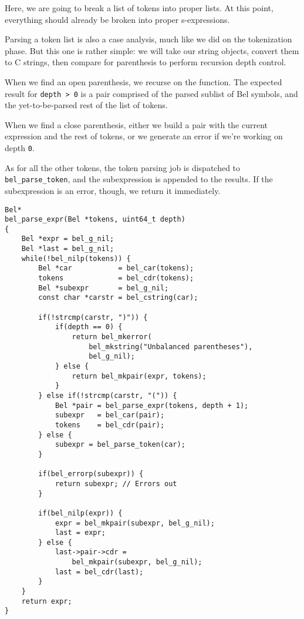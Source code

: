 \documentclass[openright,a4paper,twoside,12pt]{memoir}
\begin{document}
Here, we  are going to  break a list of  tokens into proper  lists. At
this  point,   everything  should   already  be  broken   into  proper
s-expressions.

Parsing a token list is also a  case analysis, much like we did on the
tokenization phase.  But this one is  rather simple: we will  take our
string  objects,  convert   them  to  C  strings,   then  compare  for
parenthesis to perform recursion depth control.

When we  find an  open parenthesis,  we recurse  on the  function. The
expected  result for  \texttt{depth >  0}  is a  pair comprised  of the  parsed
sublist of Bel  symbols, and the yet-to-be-parsed rest of  the list of
tokens.

When we  find a  close parenthesis,  either we build  a pair  with the
current expression and the rest of  tokens, or we generate an error if
we're working on depth \texttt{0}.

As for  all the other tokens,  the token parsing job  is dispatched to
\texttt{bel\_parse\_token}, and the subexpression is  appended to the results. If
the subexpression is an error, though, we return it immediately.

\begin{verbatim}
Bel*
bel_parse_expr(Bel *tokens, uint64_t depth)
{
    Bel *expr = bel_g_nil;
    Bel *last = bel_g_nil;
    while(!bel_nilp(tokens)) {
        Bel *car           = bel_car(tokens);
        tokens             = bel_cdr(tokens);
        Bel *subexpr       = bel_g_nil;
        const char *carstr = bel_cstring(car);

        if(!strcmp(carstr, ")")) {
            if(depth == 0) {
                return bel_mkerror(
                    bel_mkstring("Unbalanced parentheses"),
                    bel_g_nil);
            } else {
                return bel_mkpair(expr, tokens);
            }
        } else if(!strcmp(carstr, "(")) {
            Bel *pair = bel_parse_expr(tokens, depth + 1);
            subexpr   = bel_car(pair);
            tokens    = bel_cdr(pair);
        } else {
            subexpr = bel_parse_token(car);
        }

        if(bel_errorp(subexpr)) {
            return subexpr; // Errors out
        }

        if(bel_nilp(expr)) {
            expr = bel_mkpair(subexpr, bel_g_nil);
            last = expr;
        } else {
            last->pair->cdr =
                bel_mkpair(subexpr, bel_g_nil);
            last = bel_cdr(last);
        }
    }
    return expr;
}
\end{verbatim}
\end{document}
